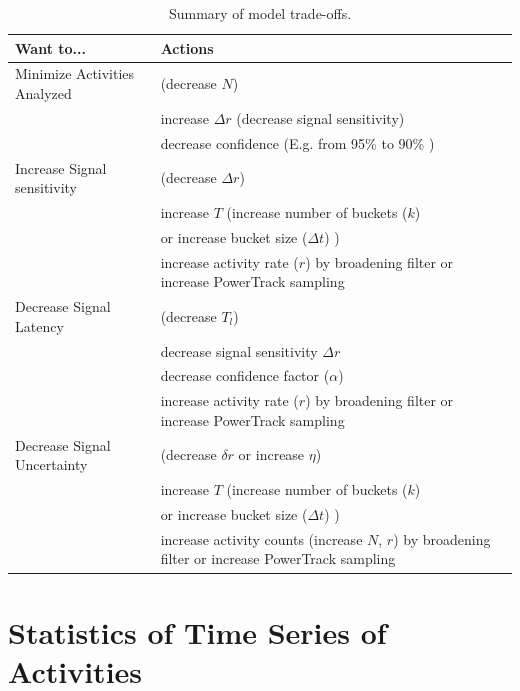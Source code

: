 \documentclass{article}
\begin{document}
\begin{table}
\caption{Summary of model trade-offs.}
\label{tab:tradeoff}
    \begin{tabular}{l| m{7cm}}
     \hline
Want to...  & Actions \\
\hline
Minimize Activities Analyzed   & (decrease $N$)  \\
                                  & increase $\Delta r$ (decrease signal sensitivity)  \\
                                  & decrease confidence (E.g. from 95\% to 90\% )  \\
\hline	
Increase Signal sensitivity   & (decrease $\Delta r$)  \\
                                  & increase $T$ (increase number of buckets ($k$)  \\
                                  & or increase bucket size ($\Delta t$) )  \\
                                  & increase activity rate ($r$) by broadening filter or increase PowerTrack sampling \\
\hline
Decrease Signal Latency      & (decrease $T_l$)  \\
                                 & decrease signal sensitivity $\Delta r$  \\
                                 & decrease confidence factor ($\alpha$) \\
                                 & increase activity rate ($r$) by broadening filter or increase PowerTrack sampling \\
\hline
Decrease Signal Uncertainty & (decrease $\delta r$ or increase $\eta$) \\
                          	  & increase $T$ (increase number of buckets ($k$)  \\
                                 & or increase bucket size ($\Delta t$) )  \\
                                 & increase activity counts (increase $N$, $r$) by broadening filter or increase PowerTrack sampling \\
\hline
\end{tabular}

\end{table}


\section{Statistics of Time Series of Activities} 
\end{document}
